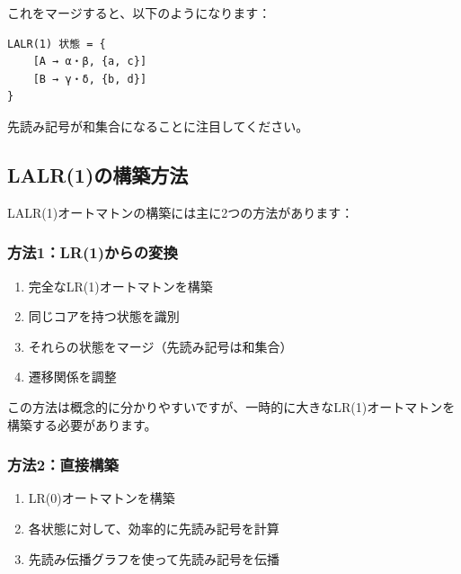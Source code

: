 これをマージすると、以下のようになります：

\begin{verbatim}
LALR(1) 状態 = {
    [A → α・β, {a, c}]
    [B → γ・δ, {b, d}]
}
\end{verbatim}

先読み記号が和集合になることに注目してください。

\hypertarget{chapter5-lalr1ux306eux69cbux7bc9ux65b9ux6cd5}{%
\subsection{LALR(1)の構築方法}\label{chapter5-lalr1ux306eux69cbux7bc9ux65b9ux6cd5}}

LALR(1)オートマトンの構築には主に2つの方法があります：

\hypertarget{chapter5-ux65b9ux6cd51lr1ux304bux3089ux306eux5909ux63db}{%
\subsubsection{方法1：LR(1)からの変換}\label{chapter5-ux65b9ux6cd51lr1ux304bux3089ux306eux5909ux63db}}

\begin{enumerate}
\def\labelenumi{\arabic{enumi}.}
\tightlist
\item
  完全なLR(1)オートマトンを構築
\item
  同じコアを持つ状態を識別
\item
  それらの状態をマージ（先読み記号は和集合）
\item
  遷移関係を調整
\end{enumerate}

この方法は概念的に分かりやすいですが、一時的に大きなLR(1)オートマトンを構築する必要があります。

\hypertarget{chapter5-ux65b9ux6cd52ux76f4ux63a5ux69cbux7bc9}{%
\subsubsection{方法2：直接構築}\label{chapter5-ux65b9ux6cd52ux76f4ux63a5ux69cbux7bc9}}

\begin{enumerate}
\def\labelenumi{\arabic{enumi}.}
\tightlist
\item
  LR(0)オートマトンを構築
\item
  各状態に対して、効率的に先読み記号を計算
\item
  先読み伝播グラフを使って先読み記号を伝播
\end{enumerate}

